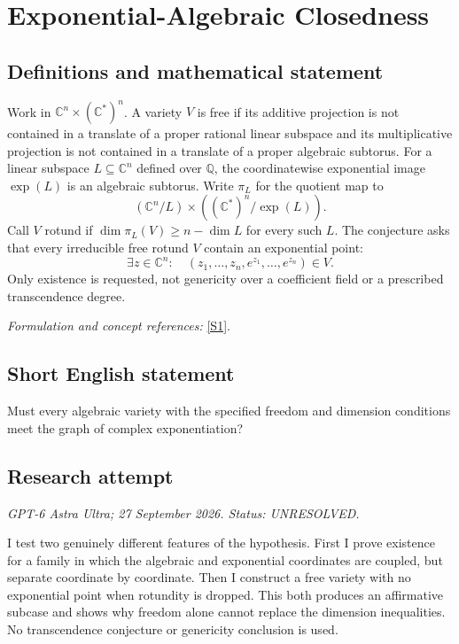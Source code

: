 \documentclass[11pt]{article}
\begin{document}
\section*{\texorpdfstring{Exponential-Algebraic Closedness}{Exponential-Algebraic Closedness}}\label{statement}
\subsection{Definitions and mathematical statement}
Work in ${\mathbb{C}}^n\times({\mathbb{C}}^*)^n$. A variety $V$ is free if its additive projection is not contained in a translate of a proper rational linear subspace and its multiplicative projection is not contained in a translate of a proper algebraic subtorus. For a linear subspace $L\subseteq{\mathbb{C}}^n$ defined over ${\mathbb{Q}}$, the coordinatewise exponential image $\exp(L)$ is an algebraic subtorus. Write $\pi_L$ for the quotient map to
\[
 ({\mathbb{C}}^n/L)\times(({\mathbb{C}}^*)^n/\exp(L)).
\]
Call $V$ rotund if $\dim\pi_L(V)\ge n-\dim L$ for every such $L$. The conjecture asks that every irreducible free rotund $V$ contain an exponential point:
\[
 \exists z\in{\mathbb{C}}^n:\quad (z_1,\ldots,z_n,e^{z_1},\ldots,e^{z_n})\in V.
\]
Only existence is requested, not genericity over a coefficient field or a prescribed transcendence degree.
\par\smallskip\textit{Formulation and concept references:} \href{https://link.springer.com/article/10.1007/s00029-023-00853-y}{[S1]}.

\subsection{Short English statement}
Must every algebraic variety with the specified freedom and dimension conditions meet the graph of complex exponentiation?
\subsection{Research attempt}
\textit{GPT-6 Astra Ultra; 27 September 2026. Status: UNRESOLVED.}

I test two genuinely different features of the hypothesis. First I prove
existence for a family in which the algebraic and exponential coordinates
are coupled, but separate coordinate by coordinate. Then I construct a
free variety with no exponential point when rotundity is dropped. This
both produces an affirmative subcase and shows why freedom alone cannot
replace the dimension inequalities. No transcendence conjecture or
genericity conclusion is used.
\end{document}
